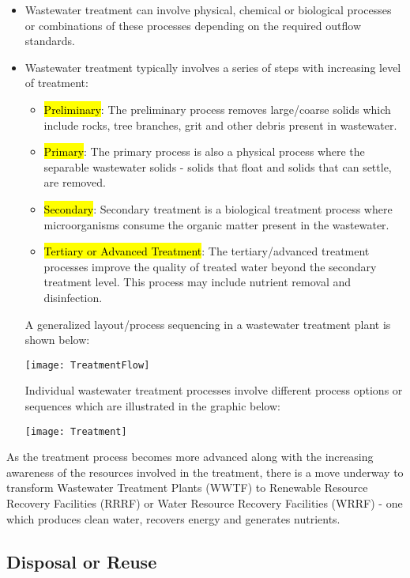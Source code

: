 \begin{itemize}
\item Wastewater treatment can involve physical, chemical or biological processes or combinations of these processes depending on the required outflow standards. 
\item Wastewater treatment typically involves a series of steps with increasing level of treatment:
\begin{itemize}
\item \hl{Preliminary}:  The preliminary process removes large/coarse solids which include rocks, tree branches, grit and other debris present in wastewater.
\item \hl{Primary}:  The primary process is also a physical process where the separable wastewater solids - solids that float and solids that can settle, are removed.  
\item \hl{Secondary}:  Secondary treatment is a biological treatment process where microorganisms consume the organic matter present in the wastewater. 
\item \hl{Tertiary or Advanced Treatment}:  The tertiary/advanced treatment processes improve the quality of treated water beyond the secondary treatment level.  This process may include nutrient removal and disinfection.
\end{itemize}

A generalized layout/process sequencing in a wastewater treatment plant is shown below:
\begin{center}
\texttt{[image: TreatmentFlow]}
\end{center}
Individual wastewater treatment processes involve different process options or sequences which are illustrated in the graphic below:
\begin{center}
\texttt{[image: Treatment]}
\end{center}
\end{itemize}
As the treatment process becomes more advanced along with the increasing awareness of the resources involved in the treatment, there is a move underway to transform Wastewater Treatment Plants (WWTF) to Renewable Resource Recovery Facilities (RRRF) or Water Resource Recovery Facilities (WRRF) - one which produces clean water, recovers energy and generates nutrients.

\subsection{Disposal or Reuse}

